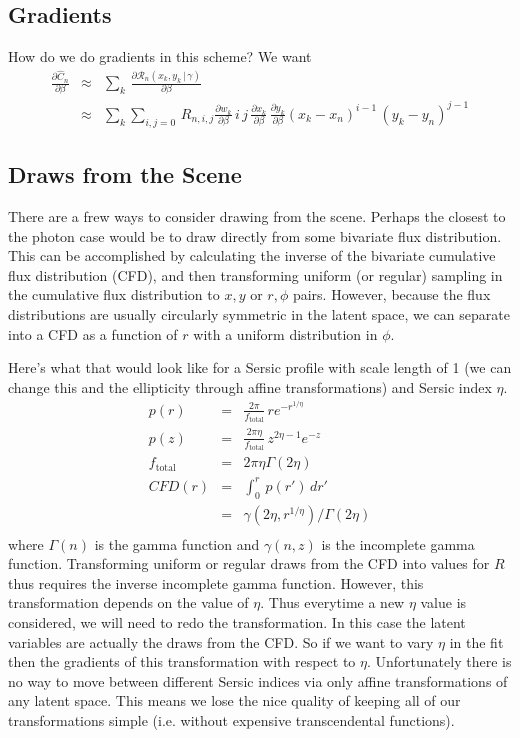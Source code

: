 \documentclass[modern]{aastex62}
\newcommand{\given}{\,|\,}
\newcommand{\countrate}{\hat{C}}
\newcommand{\prf}{\mathcal{R}}
\begin{document}
\subsection{Gradients}
How do we do gradients in this scheme?  We want 
\begin{eqnarray}
\frac{\partial\countrate_n}{\partial\beta} & \approx & \sum_k \, \frac{\partial\prf_n(x_k, y_k \given \gamma)}{\partial \beta} \nonumber \\
& \approx & \sum_k\sum_{i,j=0} \, R_{n, i, j} \frac{\partial w_k}{\partial \beta}\, i \, j \, \frac{\partial x_k}{\partial \beta}\, \frac{\partial y_k}{\partial \beta} (x_k - x_n)^{i-1} \, (y_k - y_n)^{j-1}
\end{eqnarray}


\subsection{Draws from the Scene}
There are a frew ways to consider drawing from the scene.
Perhaps the closest to the photon case would be to draw directly from some bivariate flux distribution.
This can be accomplished by calculating the inverse of the bivariate cumulative flux distribution (CFD),
 and then transforming uniform (or regular) sampling in the cumulative flux distribution to $x, y$ or $r, \phi$ pairs.
However, because the flux distributions are usually circularly symmetric in the latent space, we can separate into a CFD as a function of $r$ with a uniform distribution in $\phi$.

Here's what that would look like for a Sersic profile with scale length of 1 (we can change this and the ellipticity through affine transformations) and Sersic index $\eta$.
\begin{eqnarray}
 p(r) & = & \frac{2\pi}{f_{\mbox{total}}} \, r e^{-r^{1/\eta}} \nonumber \\
 p(z)  & = & \frac{2\pi \eta }{f_{\mbox{total}}} \, z^{2\eta - 1} e^{-z} \nonumber \\
f_{\mbox{total}} & = & 2\pi\eta \Gamma(2\eta) \nonumber \\ 
CFD(r) & = & \int_0^r \, p(r') \, dr'  \nonumber \\
   & = & \gamma(2\eta, r^{1/\eta}) / \Gamma(2\eta) \\
\end{eqnarray}
where $\Gamma(n)$ is the gamma function and $\gamma(n, z)$ is the incomplete gamma function.
Transforming uniform or regular draws from the CFD into values for $R$ thus requires the inverse incomplete gamma function.
However, this transformation depends on the value of $\eta$.
Thus everytime a new $\eta$ value is considered, we will need to redo the transformation.
In this case the latent variables are actually the draws from the CFD.
So if we want to vary $\eta$ in the fit then the gradients of this transformation with respect to $\eta$.
Unfortunately there is no way to move between different Sersic indices via only affine transformations of any latent space.
This means we lose the nice quality of keeping all of our transformations simple (i.e. without expensive transcendental functions).
\end{document}
